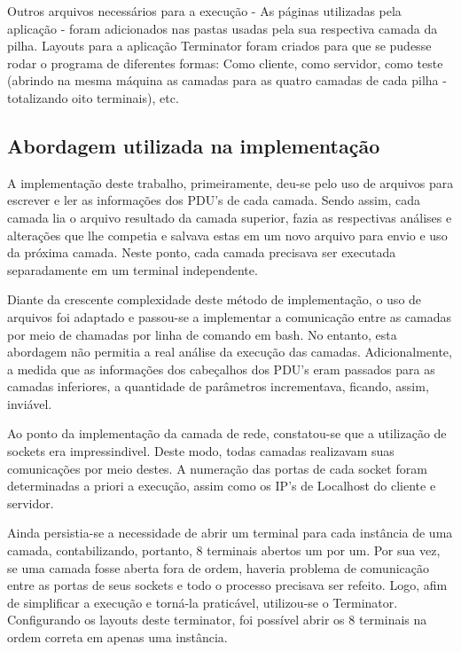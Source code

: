 \documentclass[11pt]{article}
\begin{document}
		Outros arquivos necessários para a execução - As páginas utilizadas pela aplicação - foram adicionados nas pastas usadas pela sua respectiva camada da pilha. Layouts para a aplicação Terminator foram criados para que se pudesse rodar o programa de diferentes formas: Como cliente, como servidor, como teste (abrindo na mesma máquina as camadas para as quatro camadas de cada pilha - totalizando oito terminais), etc.
	
	\subsection{Abordagem utilizada na implementação}
		
		A implementação deste trabalho, primeiramente, deu-se pelo uso de arquivos para escrever e ler as informações dos PDU's de cada camada. Sendo assim, cada camada lia o arquivo resultado da camada superior, fazia as respectivas análises e alterações que lhe competia e salvava estas em um novo arquivo para envio e uso da próxima camada. Neste ponto, cada camada precisava ser executada separadamente em um terminal independente.
		
		Diante da crescente complexidade deste método de implementação, o uso de arquivos foi adaptado e passou-se a implementar a comunicação entre as camadas por meio de chamadas por linha de comando em bash. No entanto, esta abordagem não permitia a real análise da execução das camadas. Adicionalmente, a medida que as informações dos cabeçalhos dos PDU's eram passados para as camadas inferiores, a quantidade de parâmetros incrementava, ficando, assim, inviável.
		
		Ao ponto da implementação da camada de rede, constatou-se que a utilização de sockets era impressindivel. Deste modo, todas camadas realizavam suas comunicações por meio destes. A numeração das portas de cada socket foram determinadas a priori a execução, assim como os IP's de Localhost do cliente e servidor.
		
		Ainda persistia-se a necessidade de abrir um terminal para cada instância de uma camada, contabilizando, portanto, 8 terminais abertos um por um. Por sua vez, se uma camada fosse aberta fora de ordem, haveria problema de comunicação entre as portas de seus sockets e todo o processo precisava ser refeito. Logo, afim de simplificar a execução e torná-la praticável, utilizou-se o Terminator. Configurando os layouts deste terminator, foi possível abrir os 8 terminais na ordem correta em apenas uma instância.
		
\end{document}
